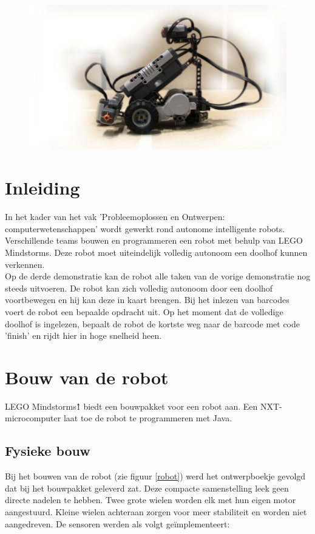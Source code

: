 \documentclass[tt3]{penoverslag}
\begin{document}
\begin{figure}[!hb]
\begin{flushright}
    \includegraphics[width=1\textwidth]{robotFP2}
    \label{fig:robotFP}
\end{flushright}
\end{figure}


\newpage 

\section{Inleiding} %
\label{ssec:inl}
In het kader van het vak 'Probleemoplossen en Ontwerpen: computerwetenschappen' wordt gewerkt rond autonome intelligente robots. Verschillende teams bouwen en programmeren een robot met behulp van LEGO Mindstorms. Deze robot moet uiteindelijk volledig autonoom een doolhof kunnen verkennen.\\
Op de derde demonstratie kan de robot alle taken van de vorige demonstratie nog steeds uitvoeren. De robot kan zich volledig autonoom door een doolhof voortbewegen en hij kan deze in kaart brengen. Bij het inlezen van barcodes voert de robot een bepaalde opdracht uit. Op het moment dat de volledige doolhof is ingelezen, bepaalt de robot de kortste weg naar de barcode met code 'finish' en rijdt hier in hoge snelheid heen.

\section{Bouw van de robot} %
\label{sec:bouw}
LEGO Mindstorms\^{1} biedt een bouwpakket voor een robot aan. Een NXT-microcomputer laat toe de robot te programmeren met Java.

\subsection{Fysieke bouw} %
\label{ssec:fysbouw}
Bij het bouwen van de robot (zie figuur \ref{robot}) werd het ontwerpboekje gevolgd dat bij het bouwpakket geleverd zat. Deze compacte samenstelling leek geen directe nadelen te hebben. Twee grote wielen worden elk met hun eigen motor aangestuurd. Kleine wielen achteraan zorgen voor meer stabiliteit en worden niet aangedreven. De sensoren werden als volgt ge\"implementeert: 
\end{document}
